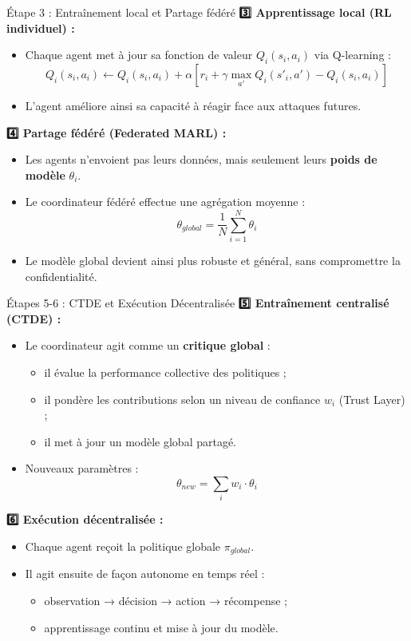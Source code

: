 \documentclass{beamer}
\begin{document}
\begin{frame}{Étape 3 : Entraînement local et Partage fédéré}
\textbf{3️⃣ Apprentissage local (RL individuel) :}
\begin{itemize}
    \item Chaque agent met à jour sa fonction de valeur $Q_i(s_i,a_i)$ via Q-learning :
    \[
    Q_i(s_i,a_i) \leftarrow Q_i(s_i,a_i) + \alpha [r_i + \gamma \max_{a'} Q_i(s'_i,a') - Q_i(s_i,a_i)]
    \]
    \item L’agent améliore ainsi sa capacité à réagir face aux attaques futures.
\end{itemize}

\vspace{0.3cm}
\textbf{4️⃣ Partage fédéré (Federated MARL) :}
\begin{itemize}
    \item Les agents n’envoient pas leurs données, mais seulement leurs \textbf{poids de modèle} $\theta_i$.
    \item Le coordinateur fédéré effectue une agrégation moyenne :
    \[
    \theta_{global} = \frac{1}{N} \sum_{i=1}^{N} \theta_i
    \]
    \item Le modèle global devient ainsi plus robuste et général, sans compromettre la confidentialité.
\end{itemize}
\end{frame}

\begin{frame}{Étapes 5-6 : CTDE et Exécution Décentralisée}
\textbf{5️⃣ Entraînement centralisé (CTDE) :}
\begin{itemize}
    \item Le coordinateur agit comme un \textbf{critique global} :
    \begin{itemize}
        \item il évalue la performance collective des politiques ;
        \item il pondère les contributions selon un niveau de confiance $w_i$ (Trust Layer) ;
        \item il met à jour un modèle global partagé.
    \end{itemize}
    \item Nouveaux paramètres :
    \[
    \theta_{new} = \sum_i w_i \cdot \theta_i
    \]
\end{itemize}

\vspace{0.3cm}
\textbf{6️⃣ Exécution décentralisée :}
\begin{itemize}
    \item Chaque agent reçoit la politique globale $\pi_{global}$.
    \item Il agit ensuite de façon autonome en temps réel :
    \begin{itemize}
        \item observation → décision → action → récompense ;
        \item apprentissage continu et mise à jour du modèle.
    \end{itemize}
\end{itemize}
\end{frame}
\end{document}
